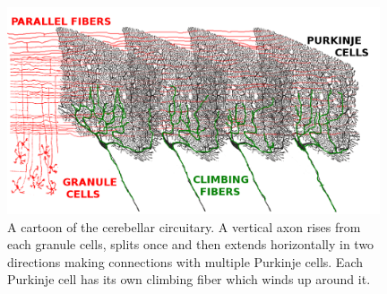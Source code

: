 \documentclass[11pt,a4paper]{scrartcl}
\begin{document}
\begin{figure}
\begin{center}
\includegraphics[width=11cm]{cerebellum.png}
\end{center}
\caption{A cartoon of the cerebellar circuitary. A vertical axon rises
  from each granule cells, splits once and then extends horizontally
  in two directions making connections with multiple Purkinje
  cells. Each Purkinje cell has its own climbing fiber which winds up
  around it.\label{fig:cerebellum}}
\end{figure}
\end{document}
